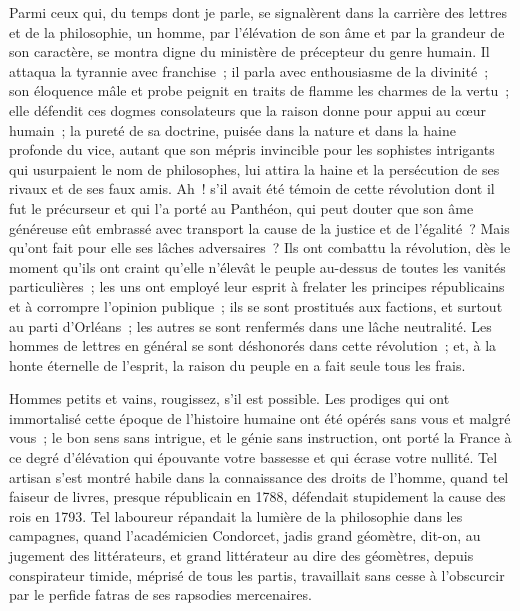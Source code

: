 \documentclass[french,twoside]{book} %
\begin{document}
Parmi ceux qui, du temps dont je parle, se signalèrent dans la carrière des lettres et de la philosophie, un homme, par l’élévation de son âme et par la grandeur de son caractère, se montra digne du ministère de précepteur du genre humain. Il attaqua la tyrannie avec franchise ; il parla avec enthousiasme de la divinité ; son éloquence mâle et probe peignit en traits de flamme les charmes de la vertu ; elle défendit ces dogmes consolateurs que la raison donne pour appui au cœur humain ; la pureté de sa doctrine, puisée dans la nature et dans la haine profonde du vice, autant que son mépris invincible pour les sophistes intrigants qui usurpaient le nom de philosophes, lui attira la haine et la persécution de ses rivaux et de ses faux amis. Ah ! s’il avait été témoin de cette révolution dont il fut le précurseur et qui l’a porté au Panthéon, qui peut douter que son âme généreuse eût embrassé avec transport la cause de la justice et de l’égalité ? Mais qu’ont fait pour elle ses lâches adversaires ? Ils ont combattu la révolution, dès le moment qu’ils ont craint qu’elle n’élevât le peuple au-dessus de toutes les vanités particulières ; les uns ont employé leur esprit à frelater les principes républicains et à corrompre l’opinion publique ; ils se sont prostitués aux factions, et surtout au parti d’Orléans ; les autres se sont renfermés dans une lâche neutralité. Les hommes de lettres en général se sont déshonorés dans cette révolution ; et, à la honte éternelle de l’esprit, la raison du peuple en a fait seule tous les frais.\par
Hommes petits et vains, rougissez, s’il est possible. Les prodiges qui ont immortalisé cette époque de l’histoire humaine ont été opérés sans vous et malgré vous ; le bon sens sans intrigue, et le génie sans instruction, ont porté la France à ce degré d’élévation qui épouvante votre bassesse et qui écrase votre nullité. Tel artisan s’est montré habile dans la connaissance des droits de l’homme, quand tel faiseur de livres, presque républicain en 1788, défendait stupidement la cause des rois en 1793. Tel laboureur répandait la lumière de la philosophie dans les campagnes, quand l’académicien Condorcet, jadis grand géomètre, dit-on, au jugement des littérateurs, et grand littérateur au dire des géomètres, depuis conspirateur timide, méprisé de tous les partis, travaillait sans cesse à l’obscurcir par le perfide fatras de ses rapsodies mercenaires.\par
\end{document}
